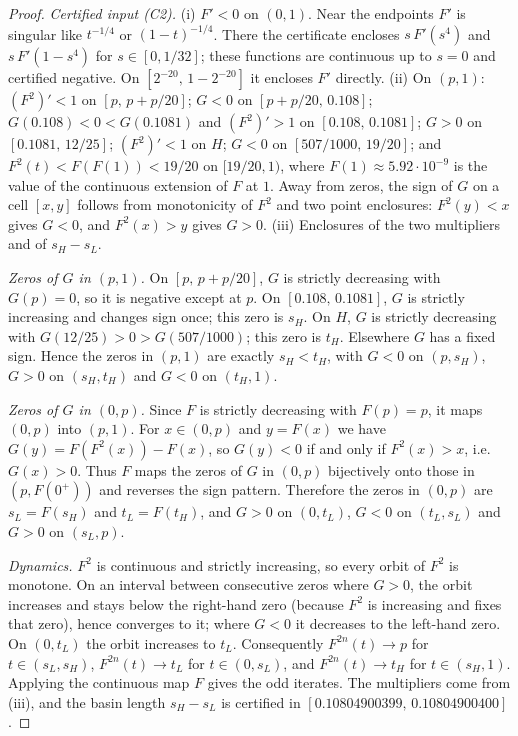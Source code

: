 \documentclass[11pt,a4paper]{article}
\theoremstyle{plain}
\theoremstyle{definition}
\begin{document}
\begin{proof}
\emph{Certified input (C2).} (i) $F'<0$ on $(0,1)$. Near the endpoints $F'$ is singular like $t^{-1/4}$ or $(1-t)^{-1/4}$. There the certificate encloses $s\,F'(s^4)$ and $s\,F'(1-s^4)$ for $s\in[0,1/32]$; these functions are continuous up to $s=0$ and certified negative. On $[2^{-20},\,1-2^{-20}]$ it encloses $F'$ directly. (ii) On $(p,1)$: $(F^2)'<1$ on $[p,\,p+p/20]$; $G<0$ on $[p+p/20,\,0.108]$; $G(0.108)<0<G(0.1081)$ and $(F^2)'>1$ on $[0.108,\,0.1081]$; $G>0$ on $[0.1081,\,12/25]$; $(F^2)'<1$ on $H$; $G<0$ on $[507/1000,\,19/20]$; and $F^2(t)<F(F(1))<19/20$ on $[19/20,1)$, where $F(1)\approx5.92\cdot10^{-9}$ is the value of the continuous extension of $F$ at $1$. Away from zeros, the sign of $G$ on a cell $[x,y]$ follows from monotonicity of $F^2$ and two point enclosures: $F^2(y)<x$ gives $G<0$, and $F^2(x)>y$ gives $G>0$. (iii) Enclosures of the two multipliers and of $s_H-s_L$.

\emph{Zeros of $G$ in $(p,1)$.} On $[p,\,p+p/20]$, $G$ is strictly decreasing with $G(p)=0$, so it is negative except at $p$. On $[0.108,\,0.1081]$, $G$ is strictly increasing and changes sign once; this zero is $s_H$. On $H$, $G$ is strictly decreasing with $G(12/25)>0>G(507/1000)$; this zero is $t_H$. Elsewhere $G$ has a fixed sign. Hence the zeros in $(p,1)$ are exactly $s_H<t_H$, with $G<0$ on $(p,s_H)$, $G>0$ on $(s_H,t_H)$ and $G<0$ on $(t_H,1)$.

\emph{Zeros of $G$ in $(0,p)$.} Since $F$ is strictly decreasing with $F(p)=p$, it maps $(0,p)$ into $(p,1)$. For $x\in(0,p)$ and $y=F(x)$ we have $G(y)=F(F^2(x))-F(x)$, so $G(y)<0$ if and only if $F^2(x)>x$, i.e.\ $G(x)>0$. Thus $F$ maps the zeros of $G$ in $(0,p)$ bijectively onto those in $(p,F(0^+))$ and reverses the sign pattern. Therefore the zeros in $(0,p)$ are $s_L=F(s_H)$ and $t_L=F(t_H)$, and $G>0$ on $(0,t_L)$, $G<0$ on $(t_L,s_L)$ and $G>0$ on $(s_L,p)$.

\emph{Dynamics.} $F^2$ is continuous and strictly increasing, so every orbit of $F^2$ is monotone. On an interval between consecutive zeros where $G>0$, the orbit increases and stays below the right-hand zero (because $F^2$ is increasing and fixes that zero), hence converges to it; where $G<0$ it decreases to the left-hand zero. On $(0,t_L)$ the orbit increases to $t_L$. Consequently $F^{2n}(t)\to p$ for $t\in(s_L,s_H)$, $F^{2n}(t)\to t_L$ for $t\in(0,s_L)$, and $F^{2n}(t)\to t_H$ for $t\in(s_H,1)$. Applying the continuous map $F$ gives the odd iterates. The multipliers come from (iii), and the basin length $s_H-s_L$ is certified in $[0.10804900399,\,0.10804900400]$.
\end{proof}
\end{document}
